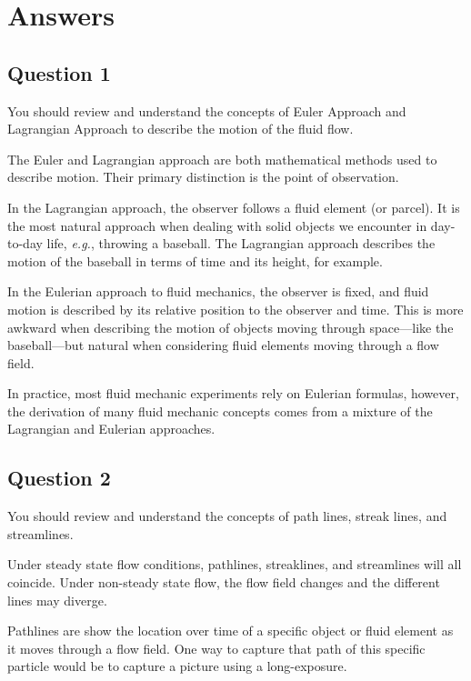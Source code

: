 \chapter{Answers}
\label{cp:answers}

\section{Question 1}
\begin{importantbox}
You should review and understand the concepts of Euler Approach and Lagrangian Approach to describe the motion of the fluid flow.
\end{importantbox}

The Euler and Lagrangian approach are both mathematical methods used to describe motion. Their primary distinction is the point of observation.

In the Lagrangian approach, the observer follows a fluid element (or parcel). It is the most natural approach when dealing with solid objects we encounter in day-to-day life, \textit{e.g.}, throwing a baseball. The Lagrangian approach describes the motion of the baseball in terms of time and its height, for example.

In the Eulerian approach to fluid mechanics, the observer is fixed, and fluid motion is described by its relative position to the observer and time. This is more awkward when describing the motion of objects moving through space—like the baseball—but natural when considering fluid elements moving through a flow field.

In practice, most fluid mechanic experiments rely on Eulerian formulas, however, the derivation of many fluid mechanic concepts comes from a mixture of the Lagrangian and Eulerian approaches.

\section{Question 2}
\begin{importantbox}
You should review and understand the concepts of path lines, streak lines, and streamlines.
\end{importantbox}

Under steady state flow conditions, pathlines, streaklines, and streamlines will all coincide. Under non-steady state flow, the flow field changes and the different lines may diverge.

Pathlines are show the location over time of a specific object or fluid element as it moves through a flow field. One way to capture that path of this specific particle would be to capture a picture using a long-exposure.

